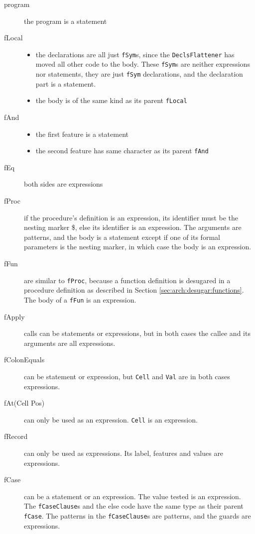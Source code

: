 \documentclass[a4paper]{memoir}
\begin{document}
\begin{description}
  \item[program] the program is a statement
  \item[fLocal] 
    \begin{itemize}
      \item the declarations are all just \lstinline!fSym!s, since the
        \lstinline!DeclsFlattener! has
        moved all other code to the body. These \lstinline!fSym!s are neither
        expressions nor statements, they are just \lstinline!fSym! declarations, and the declaration part is a statement.
      \item the body is of the same kind as its parent \lstinline!fLocal!
    \end{itemize}
  \item[fAnd] 
    \begin{itemize}
      \item the first feature is a statement
      \item the second feature has same character as its parent \lstinline!fAnd!
    \end{itemize}
  \item[fEq] both sides are expressions
  \item[fProc] if the procedure's definition is an expression, its identifier
    must be the nesting marker \$, else its identifier is an expression. The
    arguments are patterns, and the body is a statement except if one of its
    formal parameters is the nesting marker, in which case the body is an
    expression.
  \item[fFun] are similar to \lstinline!fProc!, because a function definition is desugared
    in a procedure definition as described in Section
    \ref{sec:arch:desugar:functions}. The body of a \lstinline!fFun! is an expression.
  \item[fApply] calls can be statements or expressions, but in both cases the callee and its arguments are all expressions. 
  \item[fColonEquals] can be statement or expression, but \lstinline!Cell! and
    \lstinline!Val! are in both cases expressions.
  \item[fAt(Cell Pos)] can only be used as an expression. \lstinline!Cell! is an expression.
  \item[fRecord] can only be used as expressions. Its label, features and values are
    expressions.
  \item[fCase] can be a statement or an expression. The value tested is an
    expression. The \lstinline!fCaseClause!s
    and the else code have the same type as their parent \lstinline!fCase!. The patterns in
    the \lstinline!fCaseClause!s are patterns, and the guards are expressions.
\end{description}
\end{document}
